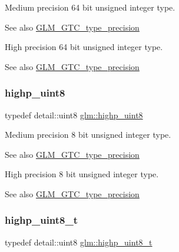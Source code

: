 Medium precision 64 bit unsigned integer type. \begin{DoxySeeAlso}{See also}
\hyperlink{group__gtc__type__precision}{G\+L\+M\+\_\+\+G\+T\+C\+\_\+type\+\_\+precision}
\end{DoxySeeAlso}
High precision 64 bit unsigned integer type. \begin{DoxySeeAlso}{See also}
\hyperlink{group__gtc__type__precision}{G\+L\+M\+\_\+\+G\+T\+C\+\_\+type\+\_\+precision} 
\end{DoxySeeAlso}
\mbox{\label{group__gtc__type__precision_ga2c27c6dd26e893786f04b10f99c1ee95}} 
\subsubsection{\texorpdfstring{highp\+\_\+uint8}{highp\_uint8}}
{\footnotesize\ttfamily typedef detail\+::uint8 \hyperlink{group__gtc__type__precision_ga2c27c6dd26e893786f04b10f99c1ee95}{glm\+::highp\+\_\+uint8}}

Medium precision 8 bit unsigned integer type. \begin{DoxySeeAlso}{See also}
\hyperlink{group__gtc__type__precision}{G\+L\+M\+\_\+\+G\+T\+C\+\_\+type\+\_\+precision}
\end{DoxySeeAlso}
High precision 8 bit unsigned integer type. \begin{DoxySeeAlso}{See also}
\hyperlink{group__gtc__type__precision}{G\+L\+M\+\_\+\+G\+T\+C\+\_\+type\+\_\+precision} 
\end{DoxySeeAlso}
\mbox{\label{group__gtc__type__precision_ga9ba529fcc75b82d23da979f0ce6e4518}} 
\subsubsection{\texorpdfstring{highp\+\_\+uint8\+\_\+t}{highp\_uint8\_t}}
{\footnotesize\ttfamily typedef detail\+::uint8 \hyperlink{group__gtc__type__precision_ga9ba529fcc75b82d23da979f0ce6e4518}{glm\+::highp\+\_\+uint8\+\_\+t}}

